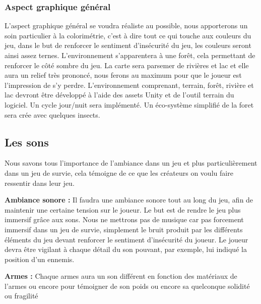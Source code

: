 \documentclass{article}
\begin{document}
\subsubsection{Aspect graphique général}

\par 
L'aspect graphique général se voudra réaliste au possible, nous apporterons un soin particulier à la colorimétrie, c'est à dire tout ce qui touche aux couleurs du jeu, dans le but de  renforcer le sentiment d'insécurité du jeu, les couleurs seront ainsi assez ternes. L'environnement s'apparentera à une forêt, cela permettant de renforcer le côté sombre du jeu. La carte sera parsemer de rivières et lac et elle aura un relief très prononcé, nous ferons au maximum pour que le joueur est l'impression de s'y perdre. L'environnement comprenant, terrain, forêt, rivière et lac devront être développé à l'aide des assets Unity et de l'outil terrain du logiciel. Un cycle jour/nuit sera implémenté. Un éco-système simplifié de la foret sera crée avec quelques insects.
\newline



\newpage
\subsection{Les sons}

\par
 Nous savons tous l'importance de l'ambiance dans un jeu et plus particulièrement dans un jeu de survie, cela témoigne de ce que les créateurs on voulu faire ressentir dans leur jeu.
\newline

\par
\textbf{Ambiance sonore :} Il faudra une ambiance sonore tout au long du jeu, afin de maintenir une certaine tension sur le joueur. Le but est de rendre le jeu plus immersif grâce aux sons. Nous ne mettrons pas de musique car pas forcement immersif dans un jeu de survie, simplement le bruit produit par les différents éléments du jeu devant renforcer le sentiment d'insécurité du joueur. Le joueur devra être vigilant à chaque détail du son pouvant, par exemple, lui indiqué la position d'un ennemis.
\newline

\par
\textbf{Armes :} Chaque armes aura un son différent en fonction des matériaux de l'armes ou encore pour témoigner de son poids ou encore sa quelconque solidité ou fragilité 
\newline
\end{document}
